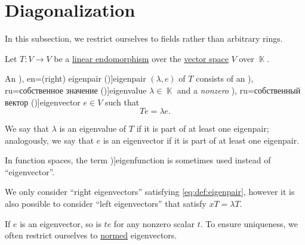 \section{Diagonalization}\label{sec:diagonalization}

In this subsection, we restrict ourselves to fields rather than arbitrary rings.

\begin{definition}\label{def:eigenpair}
  Let \( T: V \to V \) be a \hyperref[def:linear_function]{linear endomorphism} over the \hyperref[def:vector_space]{vector space} \( V \) over \( \BbbK \).

  An \term[ru=собственная пара (\cite[\S 29.2]{Тыртышников2007ЛинейнаяАлгебра}), en=(right) eigenpair (\cite[def. 1.1]{Stewart2001MatrixAlgorithmsVol2})]{eigenpair} \( (\lambda, e) \) of \( T \) consists of an \term[bg=собствена стойност (\cite[256]{ГеновМиховскиМоллов1991Алгебра}), ru=собственное значение (\cite[\S 29.2]{Тыртышников2007ЛинейнаяАлгебра})]{eigenvalue} \( \lambda \in \BbbK \) and a \emph{nonzero} \term[bg=собствен вектор (\cite[256]{ГеновМиховскиМоллов1991Алгебра}), ru=собственный вектор (\cite[\S 29.2]{Тыртышников2007ЛинейнаяАлгебра})]{eigenvector} \( e \in V \) such that
  \begin{equation}\label{eq:def:eigenpair}
    Te = \lambda e.
  \end{equation}

  We say that \( \lambda \) is an eigenvalue of \( T \) if it is part of at least one eigenpair; analogously, we say that \( e \) is an eigenvector if it is part of at least one eigenpair.

  In function spaces, the term \term[en=eigenfunction (\cite[145]{Lorentz1966ApproximationOfFunctions})]{eigenfunction} is sometimes used instead of \enquote{eigenvector}.
\end{definition}
\begin{comments}
  \item We only consider \enquote{right eigenvectors} satisfying \eqref{eq:def:eigenpair}, however it is also possible to consider \enquote{left eigenvectors} that satisfy \( x T = \lambda T \).

  \item If \( e \) is an eigenvector, so is \( te \) for any nonzero scalar \( t \). To ensure uniqueness, we often restrict ourselves to \hyperref[def:normed_vector]{normed} eigenvectors.
\end{comments}

